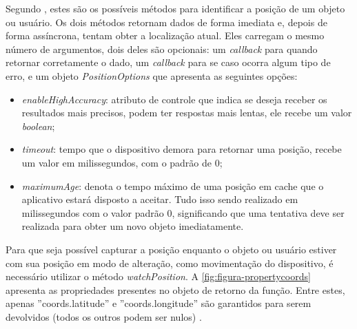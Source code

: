 Segundo , estes são os possíveis métodos para identificar a posição de um objeto ou usuário. Os dois métodos retornam dados de forma imediata e, depois de forma assíncrona, tentam obter a localização atual. Eles carregam o mesmo número de argumentos, dois deles são opcionais: um \textit{callback} para quando retornar corretamente o dado, um \textit{callback} para se caso ocorra algum tipo de erro, e um objeto \textit{PositionOptions} que apresenta as seguintes opções:

\begin{itemize}
    \item \textit{enableHighAccuracy}: atributo de controle que indica se deseja receber os resultados mais precisos, podem ter respostas mais lentas, ele recebe um valor \textit{boolean};
    \item \textit{timeout}: tempo que o dispositivo demora para retornar uma posição, recebe um valor em milissegundos, com o padrão de 0;
    \item \textit{maximumAge}: denota o tempo máximo de uma posição em cache que o aplicativo estará disposto a aceitar. Tudo isso sendo realizado em milissegundos com o valor padrão 0, significando que uma tentativa deve ser realizada para obter um novo objeto imediatamente.
\end{itemize}


Para que seja possível capturar a posição enquanto o objeto ou usuário estiver com sua posição em modo de alteração, como movimentação do dispositivo, é necessário utilizar o método \textit{watchPosition}. A \autoref{fig:figura-propertycoords} apresenta as propriedades presentes no objeto de retorno da função. Entre estes, apenas ''coords.latitude'' e ''coords.longitude'' são garantidos para serem devolvidos (todos os outros podem ser nulos) \cite{geolocalizacao:2011}.

